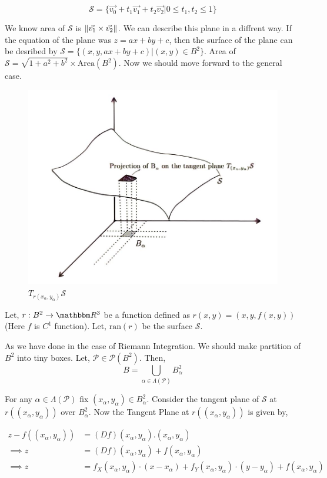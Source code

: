 \documentclass[Analysis-3]{subfiles}
\begin{document}
$$ \mathcal{S} = \{ \vec{v_0} + t_1 \vec{v_1} +t_2 \vec{v_2}  |  0 \le t_1,t_2 \le 1\} $$

We know area of $\mathcal{S}$ is $\norm{\vec{v_1}\times \vec{v_2}}$. We can describe this plane in a diffrent way. If the equation of the plane  was $z=ax+by+c$, then the surface of the plane can be desribed by $\mathcal{S} = \{(x , y, ax+by+c) | (x,y) \in B^2 \}$. Area of $\mathcal{S} = \sqrt{1+a^2+b^2} \times \text{Area}(B^2)$. Now we should move forward to the general case.

\begin{figure}
    \centering
   \includegraphics[width=.78\linewidth]{figures/lec-25.2.png}
    \caption{$T_{r(x_{\alpha},y_{\alpha})} \mathcal{S}$}
\end{figure} 


Let, $r : B^2 \to \R^3$ be a function defined as $r(x,y) = (x,y,f(x,y))$ (Here $f$ is $C^1$ function). Let, $\text{ran}(r)$ be the surface $\mathcal{S}$. 

\vspace{0.2cm}

As we have done in the case of Riemann Integration. We should make partition of $B^2$ into tiny boxes.  Let, $\mathcal{P} \in \mathscr{P}(B^2)$. Then,
\[B = \bigcup_{\alpha \in \Lambda(\mathcal{P})} B_{\alpha}^2\]

For any $\alpha \in \Lambda(\mathcal{P})$ fix $(x_{\alpha},y_{\alpha}) \in B_{\alpha}^2$. Consider the tangent plane of $\mathcal{S}$ at $r((x_{\alpha},y_{\alpha}))$ over $B_{\alpha}^2$. Now the Tangent Plane at $r((x_{\alpha},y_{\alpha}))$ is given by,

\begin{align*}
    z - f((x_{\alpha},y_{\alpha})) &= (Df)(x_{\alpha},y_{\alpha}).(x_{\alpha},y_{\alpha}) \\
     \implies z &= (Df)(x_{\alpha},y_{\alpha}) + f(x_{\alpha},y_{\alpha}) \\
     \implies z &= f_X(x_{\alpha},y_{\alpha}) \cdot (x - x_{\alpha}) +f_Y(x_{\alpha},y_{\alpha}) \cdot (y - y_{\alpha}) + f(x_{\alpha},y_{\alpha})\\
\end{align*}
\end{document}

